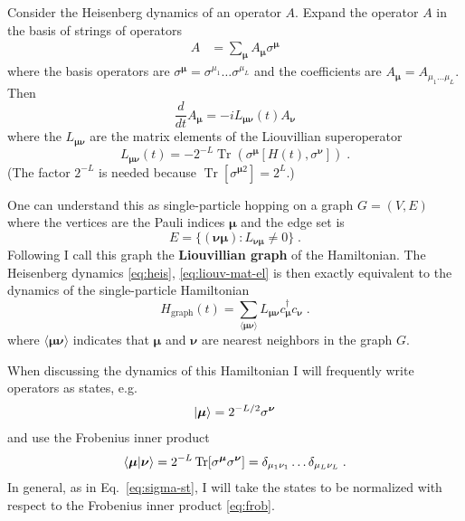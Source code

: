 \documentclass[aps,prb,nofootinbib,twocolumn,balancelastpage,amsmath,amssymb,floatfix,superscriptaddress,]{revtex4-1}
\newcommand{\tr}{\operatorname{Tr}}
\newcommand{\graph}{\mathrm{graph}}
\begin{document}
Consider the Heisenberg dynamics of an operator $A$.
Expand the operator $A$ in the basis of strings of operators
\begin{align}
  A &= \sum_{\bm \mu}  A_{\bm \mu}  \sigma ^{\bm \mu}
\end{align}
where the basis operators are $\sigma^{\bm \mu} = \sigma^{\mu_1} \dots \sigma^{\mu_L}$ and the coefficients are $A_{\bm \mu} = A_{\mu_1 \dots \mu_L}$.
Then
\begin{equation}
  \label{eq:heis}
  \frac d {dt} A_{\bm \mu}  = -i L_{\bm \mu \bm \nu }(t) A_{\bm \nu}
\end{equation}
where the $L_{\bm \mu \bm \nu}$ are the matrix elements of the Liouvillian superoperator
\begin{equation}
  \label{eq:liouv-mat-el}
 L_{\bm \mu \bm \nu }(t) = -2^{-L}\tr( \sigma ^{\bm \mu}  [H(t), \sigma^{\bm \nu} ]) \;.
\end{equation}
(The factor $2^{-L}$ is needed because $\tr [\sigma^{\bm \mu 2}] = 2^L$.)

One can understand this as single-particle hopping on a graph $G = (V,E)$ where the vertices are the Pauli indices $\bm \mu $ and the edge set is
\begin{equation}
  E = \{(\bm \nu \bm \mu ) : L_{\bm \nu \bm \mu } \ne 0\}\;.
\end{equation}
Following  I call this graph the \textbf{Liouvillian graph} of the Hamiltonian.
The Heisenberg dynamics \eqref{eq:heis}, \eqref{eq:liouv-mat-el} is then exactly equivalent to the dynamics of the single-particle Hamiltonian
\begin{equation}
  \label{eq:Hgraph}
  H_\graph(t) = \sum_{\langle \bm \mu \bm \nu  \rangle} L_{\bm \mu \bm \nu } c^\dagger_{\bm \mu}  c_{\bm \nu }\;.
\end{equation}
where $\langle \bm \mu \bm \nu  \rangle$ indicates that $\bm \mu $ and $\bm \nu $ are nearest neighbors in the graph $G$.

When discussing the dynamics of this Hamiltonian I will frequently write operators as states, e.g.
\begin{align}
  \label{eq:sigma-st}
  \ket{\bm \mu} = 2^{-L/2} \sigma^{\bm \nu}
\end{align}
and use the Frobenius inner product
\begin{align}
  \label{eq:frob}
  \braket{\bm \mu|\bm \nu} = 2^{-L} \tr[\sigma^{\bm \mu} \sigma^{\bm \nu}] = \delta_{\mu_1 \nu_1} \dots \delta_{\mu_L \nu_L}\;.
\end{align}
In general, as in Eq.~\eqref{eq:sigma-st},
I will take the states to be normalized with respect to the Frobenius inner product \eqref{eq:frob}.
\end{document}

